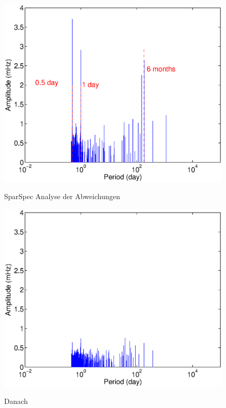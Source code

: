 \begin{figure}[htnb]
\begin{minipage}[t]{.48\linewidth}
	\centering
	\includegraphics[width=\linewidth]{images/SparSpec_begining}
	\label{fig:SparSpec_pre}
  \caption{SparSpec Analyse der Abweichungen }
\end{minipage}
\hfill
\begin{minipage}[t]{.48\linewidth}
	\centering
	\includegraphics[width=\linewidth]{images/SparSpec_end}
	\label{fig:SparSpec_post}
  \caption{ Danach}
\end{minipage}
 \end{figure}

